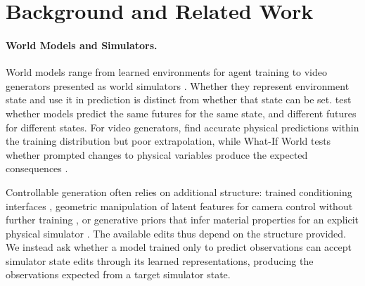 \documentclass{article} %
\begin{document}
\section{Background and Related Work}

\paragraph{World Models and Simulators.}
World models range from learned environments for agent training \citep{ha2018worldmodels} to video generators presented as world simulators \citep{brooks2024sora,bruce2024genie,nvidia2025cosmos}. Whether they represent environment state and use it in prediction \citep{li2025definition} is distinct from whether that state can be set. \citet{vafa2024evaluating} test whether models predict the same futures for the same state, and different futures for different states. For video generators, \citet{kang2025physical} find accurate physical predictions within the training distribution but poor extrapolation, while What-If World tests whether prompted changes to physical variables produce the expected consequences \citep{cai2026whatif}.

Controllable generation often relies on additional structure: trained conditioning interfaces \citep{zhang2023controlnet,wang2024motionctrl,nvidia2025transfer}, geometric manipulation of latent features for camera control without further training \citep{hou2026camera}, or generative priors that infer material properties for an explicit physical simulator \citep{zhang2024physdreamer}. The available edits thus depend on the structure provided. We instead ask whether a model trained only to predict observations can accept simulator state edits through its learned representations, producing the observations expected from a target simulator state.

\end{document}
